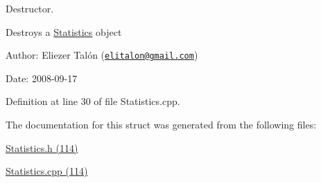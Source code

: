 Destructor. 

Destroys a \hyperlink{struct_statistics}{Statistics} object

\begin{Desc}
\item[Author:]Eliezer Talón (\href{mailto:elitalon@gmail.com}{\tt elitalon@gmail.com}) \end{Desc}
\begin{Desc}
\item[Date:]2008-09-17 \end{Desc}


Definition at line 30 of file Statistics.cpp.

The documentation for this struct was generated from the following files:\begin{CompactItemize}
\item 
\hyperlink{_statistics_8h}{Statistics.h (114)}\item 
\hyperlink{_statistics_8cpp}{Statistics.cpp (114)}\end{CompactItemize}
